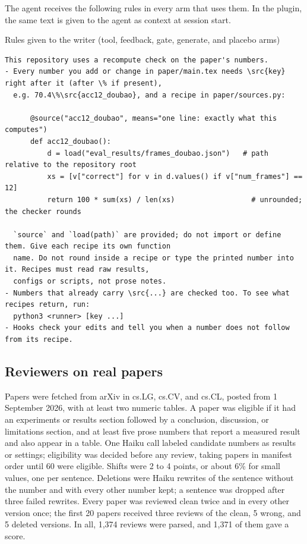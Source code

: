 The agent receives the following rules in every arm that uses them. In the plugin, the same text is given to the
agent as context at session start.
\begin{promptbox}{Rules given to the writer (tool, feedback, gate, generate, and placebo arms)}
\begin{lstlisting}[style=plain,basicstyle=\ttfamily\scriptsize]
This repository uses a recompute check on the paper's numbers.
- Every number you add or change in paper/main.tex needs \src{key} right after it (after \% if present),
  e.g. 70.4\%\src{acc12_doubao}, and a recipe in paper/sources.py:

      @source("acc12_doubao", means="one line: exactly what this computes")
      def acc12_doubao():
          d = load("eval_results/frames_doubao.json")   # path relative to the repository root
          xs = [v["correct"] for v in d.values() if v["num_frames"] == 12]
          return 100 * sum(xs) / len(xs)                  # unrounded; the checker rounds

  `source` and `load(path)` are provided; do not import or define them. Give each recipe its own function
  name. Do not round inside a recipe or type the printed number into it. Recipes must read raw results,
  configs or scripts, not prose notes.
- Numbers that already carry \src{...} are checked too. To see what recipes return, run:
  python3 <runner> [key ...]
- Hooks check your edits and tell you when a number does not follow from its recipe.
\end{lstlisting}
\end{promptbox}

\subsection{Reviewers on real papers}
\label{app:killa}

Papers were fetched from arXiv in cs.LG, cs.CV, and cs.CL, posted from 1 September 2026, with at least two numeric
tables. A paper was eligible if it had an experiments or results section followed by a conclusion, discussion, or
limitations section, and at least five prose numbers that report a measured result and also appear in a table. One
Haiku call labeled candidate numbers as results or settings; eligibility was decided before any review, taking papers
in manifest order until 60 were eligible. Shifts were 2 to 4 points, or about 6\% for small values, one per sentence.
Deletions were Haiku rewrites of the sentence without the number and with every other number kept; a sentence was
dropped after three failed rewrites. Every paper was reviewed clean twice and in every other version once; the first
20 papers received three reviews of the clean, 5 wrong, and 5 deleted versions. In all, 1,374 reviews were parsed, and 1,371 of them gave a score.

